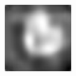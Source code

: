\begin{figure}[H]
\begin{subfigure}[t]{0.13\textwidth}
  \end{subfigure}
  \begin{subfigure}[t]{0.13\textwidth}
    \centering
    \includegraphics[width=\linewidth]{img/one-trial/intermediate-cnnv4/prediction_1.png}
  \end{subfigure}
  \\
    \vspace{0.1cm}
  

\end{figure}
